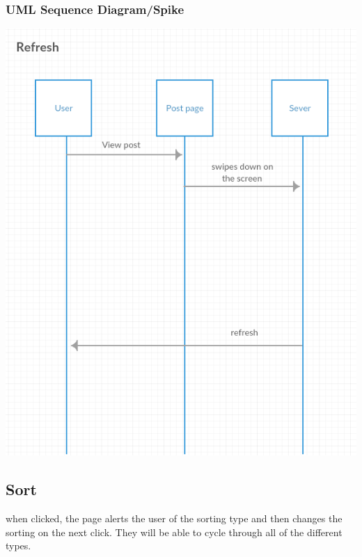 \documentclass[12pt]{article}
\begin{document}
\subsubsection{UML Sequence Diagram/Spike}
\includegraphics[scale=0.5]{img/6.png}\linebreak

\subsection{Sort}
when clicked, the page alerts the user of the sorting type and then changes the
sorting on the next click. They will be able to cycle through all of the
different types.
\end{document}

